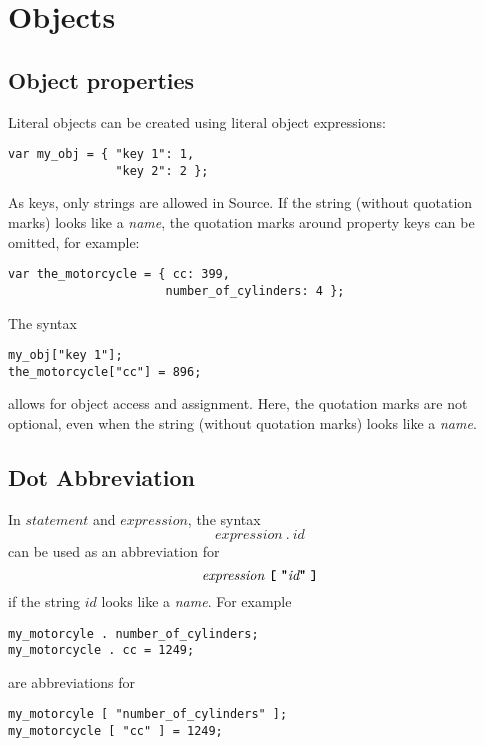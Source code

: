\section*{Objects}

\subsection*{Object properties}

Literal objects can be created using literal object expressions:
\begin{lstlisting}
var my_obj = { "key 1": 1,
               "key 2": 2 };
\end{lstlisting}

As keys, only strings are allowed in Source.
If the string (without quotation marks) looks like a \textit{name}, the
quotation marks around property keys can be omitted, for example:
\begin{lstlisting}
var the_motorcycle = { cc: 399,
                      number_of_cylinders: 4 };
\end{lstlisting}

The syntax
\begin{lstlisting}
my_obj["key 1"];
the_motorcycle["cc"] = 896;
\end{lstlisting}
allows for object access and assignment. Here, the quotation marks are not optional,
even when the string (without quotation marks) looks like a \textit{name}.

\subsection*{Dot Abbreviation}

In $\textit{statement}$ and $\textit{expression}$, the syntax
\[
\textit{expression} \ \texttt{.}\ \textit{id}
\]
can be used as an abbreviation for
\[
\textit{expression} \ \textbf{\texttt{[}}\  \texttt{\bf "} \textit{id}
\texttt{\bf "}\ \textbf{\texttt{]}}
\]
if the string $\textit{id}$ looks like a \textit{name}.
For example
\begin{lstlisting}
my_motorcyle . number_of_cylinders;
my_motorcycle . cc = 1249;
\end{lstlisting}
are abbreviations for
\begin{lstlisting}
my_motorcyle [ "number_of_cylinders" ];
my_motorcycle [ "cc" ] = 1249;
\end{lstlisting}
